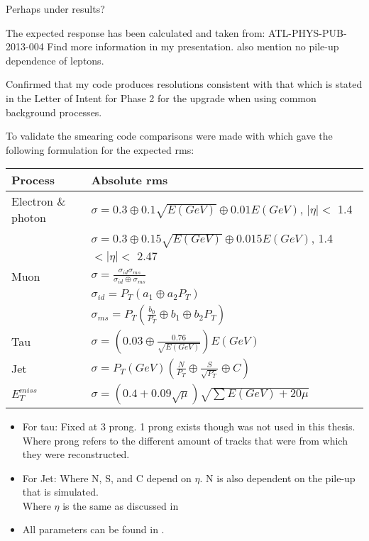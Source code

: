 Perhaps under results?

The expected response has been calculated and taken from: ATL-PHYS-PUB-2013-004
Find more information in my presentation. also mention no pile-up dependence of leptons.

Confirmed that my code produces resolutions consistent with that which is stated in the Letter of Intent for Phase 2 for the upgrade when using common background processes.

To validate the smearing code comparisons were made with \citep{ATL-PHYS-PUB-2013-004} which gave the following formulation for the expected rms: 
\begin{table}[h]
\renewcommand{\arraystretch}{1.5} %
\begin{tabular}{|l|l|}
\hline
Process & Absolute rms \\ \hline
Electron \& photon & $\sigma=0.3\oplus 0.1\sqrt{E(GeV)}\oplus 0.01E(GeV)$, $|\eta|<$ 1.4 \\
& $\sigma=0.3\oplus 0.15\sqrt{E(GeV)}\oplus 0.015E(GeV)$, 1.4 $<|\eta|<$ 2.47 \\ \hline 
Muon & $\sigma=\frac{\sigma_{id} \sigma_{ms}}{\sigma_{id} \oplus \sigma_{ms}}$\\
& $\sigma_{id}=P_T(a_1 \oplus a_2 P_T)$\\
& $\sigma_{ms}=P_T(\frac{b_0}{P_T} \oplus b_1 \oplus b_2 P_T)$\\ \hline
Tau & $\sigma =(0.03\oplus \frac{0.76}{\sqrt{E(GeV)}})E(GeV)$ \\ \hline
Jet & $\sigma = P_T(GeV)(\frac{N}{P_T} \oplus \frac{S}{\sqrt{P_T}} \oplus C)$ \\ \hline
$E_T^{miss}$ & $\sigma = (0.4+0.09\sqrt{\mu})\sqrt{\sum E(GeV)+20\mu}$ \\ \hline
\end{tabular}
\renewcommand{\arraystretch}{1.0} %
\end{table}
\begin{itemize}
\item For tau: Fixed at 3 prong. 1 prong exists though was not used in this thesis. \\
Where prong refers to the different amount of tracks that were from which they were reconstructed.
\item For Jet: Where N, S, and C depend on $\eta$. N is also dependent on the pile-up that is simulated.\\
Where $\eta$ is the same as discussed in 
\item All parameters can be found in \citep{ATL-PHYS-PUB-2013-004}.
\end{itemize}

